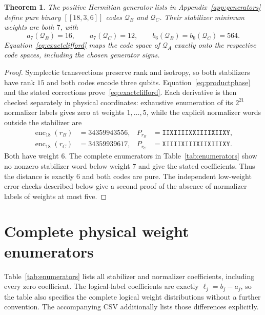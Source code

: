 \documentclass[11pt,a4paper]{article}
\newtheorem{theorem}{Theorem}
\newcommand{\CA}{\mathcal Q_A}
\newcommand{\CB}{\mathcal Q_B}
\newcommand{\CC}{\mathcal Q_C}
\newcommand{\pauli}[1]{\texttt{#1}}
\begin{document}
\begin{theorem}\label{thm:BC}
The positive Hermitian generator lists in Appendix~\ref{app:generators} define pure binary $[[18,3,6]]$ codes $\CB$ and $\CC$. Their stabilizer minimum weights are both $7$, with
\[
 a_7(\CB)=16,\qquad a_7(\CC)=12,
 \qquad b_6(\CB)=b_6(\CC)=564.
\]
Equation~\eqref{eq:exactclifford} maps the code space of $\CA$ exactly onto the respective code spaces, including the chosen generator signs.
\end{theorem}
\begin{proof}
Symplectic transvections preserve rank and isotropy, so both stabilizers have rank $15$ and both codes encode three qubits. Equation~\eqref{eq:productphase} and the stated corrections prove~\eqref{eq:exactclifford}. Each derivative is then checked separately in physical coordinates: exhaustive enumeration of its $2^{21}$ normalizer labels gives zero at weights $1,\ldots,5$, while the explicit normalizer words outside the stabilizer are
\begin{align}
 \operatorname{enc}_{18}(r_B)&=34359943556,
 &P_{r_B}&=\pauli{IIXIIIIXXIIIIXIIXY},\label{eq:witnessB}\\
 \operatorname{enc}_{18}(r_C)&=34359939617,
 &P_{r_C}&=\pauli{XIIIIXIIIXIIXIIIXY}.\label{eq:witnessC}
\end{align}
Both have weight $6$. The complete enumerators in Table~\ref{tab:enumerators} show no nonzero stabilizer word below weight $7$ and give the stated coefficients. Thus the distance is exactly $6$ and both codes are pure. The independent low-weight error checks described below give a second proof of the absence of normalizer labels of weights at most five.
\end{proof}

\section{Complete physical weight enumerators}\label{sec:certificates}
Table~\ref{tab:enumerators} lists all stabilizer and normalizer coefficients, including every zero coefficient. The logical-label coefficients are exactly $\ell_j=b_j-a_j$, so the table also specifies the complete logical weight distributions without a further convention. The accompanying CSV additionally lists those differences explicitly.
\end{document}
